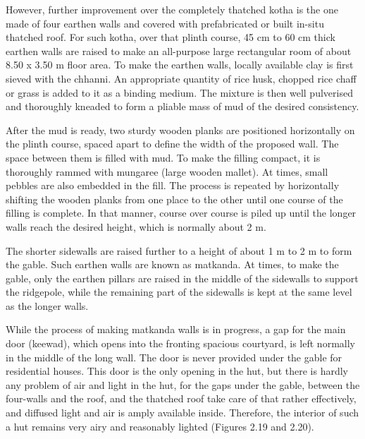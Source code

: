 However, further improvement over the completely thatched kotha is the one made of four earthen walls and covered with prefabricated or built in-situ thatched roof. For such kotha, over that plinth course, 45 cm to 60 cm thick earthen walls are raised to make an all-purpose large rectangular room of about 8.50 x 3.50 m floor area. To make the earthen walls, locally available clay is first sieved with the chhanni. An appropriate quantity of rice husk, chopped rice chaff or grass is added to it as a binding medium. The mixture is then well pulverised and thoroughly kneaded to form a pliable mass of mud of the desired consistency.

After the mud is ready, two sturdy wooden planks are positioned horizontally on the plinth course, spaced apart to define the width of the proposed wall. The space between them is filled with mud. To make the filling compact, it is thoroughly rammed with mungaree (large wooden mallet). At times, small pebbles are also embedded in the fill. The process is repeated by horizontally shifting the wooden planks from one place to the other until one course of the filling is complete. In that manner, course over course is piled up until the longer walls reach the desired height, which is normally about 2 m.

The shorter sidewalls are raised further to a height of about 1 m to 2 m to form the gable. Such earthen walls are known as matkanda. At times, to make the gable, only the earthen pillars are raised in the middle of the sidewalls to support the ridgepole, while the remaining part of the sidewalls is kept at the same level as the longer walls.

While the process of making matkanda walls is in progress, a gap for the main door (keewad), which opens into the fronting spacious courtyard, is left normally in the middle of the long wall. The door is never provided under the gable for residential houses. This door is the only opening in the hut, but there is hardly any problem of air and light in the hut, for the gaps under the gable, between the four-walls and the roof, and the thatched roof take care of that rather effectively, and diffused light and air is amply available inside. Therefore, the interior of such a hut remains very airy and reasonably lighted (Figures 2.19 and 2.20).

